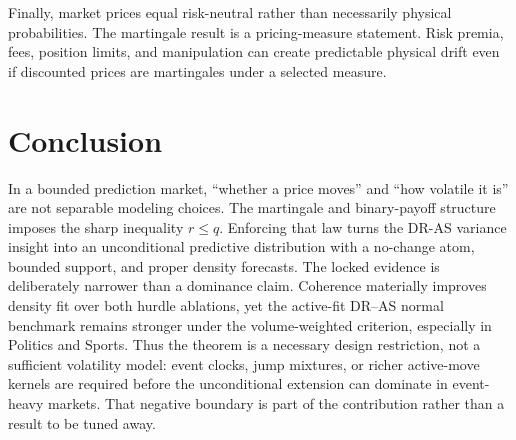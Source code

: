 \documentclass[11pt]{article}
\newcommand{\1}{\mathbb I}
\begin{document}
Finally, market prices equal risk-neutral rather than necessarily physical
probabilities. The martingale result is a pricing-measure statement. Risk
premia, fees, position limits, and manipulation can create predictable physical
drift even if discounted prices are martingales under a selected measure.

\section{Conclusion}

In a bounded prediction market, ``whether a price moves'' and ``how volatile it
is'' are not separable modeling choices. The martingale and binary-payoff
structure imposes the sharp inequality $r\le q$. Enforcing that law turns the
DR-AS variance insight into an unconditional predictive distribution with a
no-change atom, bounded support, and proper density forecasts. The locked
evidence is deliberately narrower than a dominance claim. Coherence materially
improves density fit over both hurdle ablations, yet the active-fit DR--AS normal
benchmark remains stronger under the volume-weighted criterion, especially in
Politics and Sports. Thus the theorem is a necessary design restriction, not a
sufficient volatility model: event clocks, jump mixtures, or richer active-move
kernels are required before the unconditional extension can dominate in
event-heavy markets. That negative boundary is part of the contribution rather
than a result to be tuned away.
\end{document}
